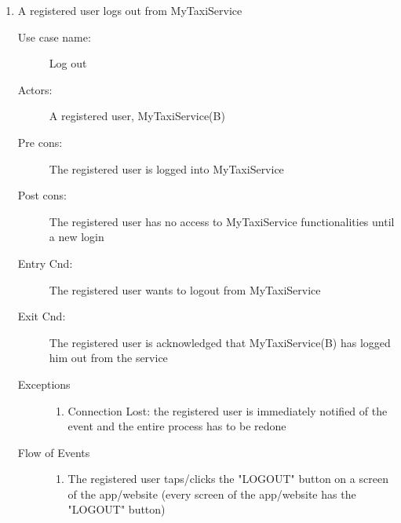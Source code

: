 \documentclass[11pt]{article} %
\begin{document}
\begin{enumerate}
	       \item A registered user logs out from MyTaxiService
		\begin{description}
		        \item [Use case name:] Log out
		        \item [Actors:] A registered user, MyTaxiService(B)
		        \item [Pre cons:] The registered user is logged into MyTaxiService
		        \item [Post cons:] The registered user has no access to MyTaxiService functionalities
		        until a new login
		        \item [Entry Cnd:] The registered user wants to logout from MyTaxiService
		        \item [Exit Cnd:] The registered user is acknowledged that MyTaxiService(B) has logged him out from
		        the service
		        \item [Exceptions]\hfill
			\begin{enumerate}
			          \item Connection Lost: the registered user is immediately notified of the event and the entire process
			          has to be redone
			\end{enumerate}
		        \item [Flow of Events]\hfill
			\begin{enumerate}
			          \item The registered user taps/clicks the "LOGOUT" button on a screen of the app/website
			          (every screen of the app/website has the "LOGOUT" button)
			\end{enumerate}
		\end{description}
	

\end{enumerate}
\end{document}
